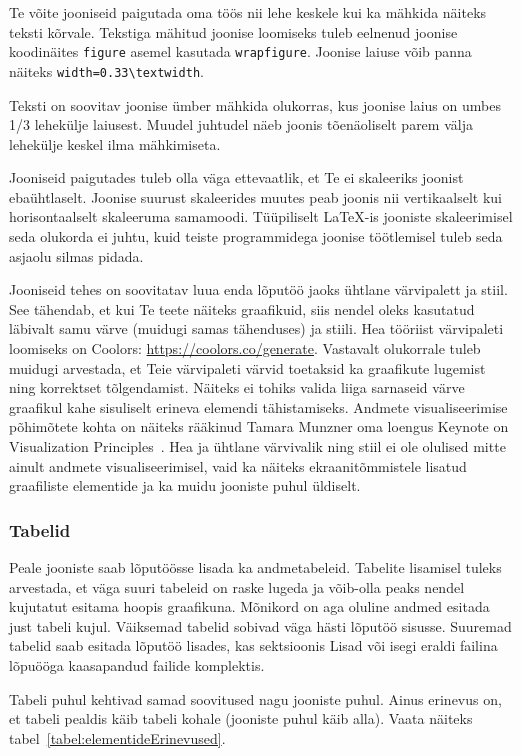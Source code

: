 Te võite jooniseid paigutada oma töös nii lehe keskele kui ka mähkida näiteks teksti kõrvale. Tekstiga mähitud joonise loomiseks tuleb eelnenud joonise koodinäites \verb|figure| asemel kasutada \verb|wrapfigure|. Joonise laiuse võib panna näiteks \verb|width=0.33\textwidth|.

Teksti on soovitav joonise ümber mähkida olukorras, kus joonise laius on umbes 1/3 lehekülje laiusest. Muudel juhtudel näeb joonis tõenäoliselt parem välja lehekülje keskel ilma mähkimiseta.

Jooniseid paigutades tuleb olla väga ettevaatlik, et Te ei skaleeriks joonist ebaühtlaselt. Joonise suurust skaleerides muutes peab joonis nii vertikaalselt kui horisontaalselt skaleeruma samamoodi. Tüüpiliselt LaTeX-is jooniste skaleerimisel seda olukorda ei juhtu, kuid teiste programmidega joonise töötlemisel tuleb seda asjaolu silmas pidada.

Jooniseid tehes on soovitatav luua enda lõputöö jaoks ühtlane värvipalett ja stiil. See tähendab, et kui Te teete näiteks graafikuid, siis nendel oleks kasutatud läbivalt samu värve (muidugi samas tähenduses) ja stiili. Hea tööriist värvipaleti loomiseks on Coolors: \url{https://coolors.co/generate}. Vastavalt olukorrale tuleb muidugi arvestada, et Teie värvipaleti värvid toetaksid ka graafikute lugemist ning korrektset tõlgendamist. Näiteks ei tohiks valida liiga sarnaseid värve graafikul kahe sisuliselt erineva elemendi tähistamiseks. Andmete visualiseerimise põhimõtete kohta on näiteks rääkinud Tamara Munzner oma loengus Keynote on Visualization Principles~\cite{tamara_munzner_keynote_2012}. Hea ja ühtlane värvivalik ning stiil ei ole olulised mitte ainult andmete visualiseerimisel, vaid ka näiteks ekraanitõmmistele lisatud graafiliste elementide ja ka muidu jooniste puhul üldiselt.

\subsubsection{Tabelid}
Peale jooniste saab lõputöösse lisada ka andmetabeleid. Tabelite lisamisel tuleks arvestada, et väga suuri tabeleid on raske lugeda ja võib-olla peaks nendel kujutatut esitama hoopis graafikuna. Mõnikord on aga oluline andmed esitada just tabeli kujul. Väiksemad tabelid sobivad väga hästi lõputöö sisusse. Suuremad tabelid saab esitada lõputöö lisades, kas sektsioonis Lisad või isegi eraldi failina lõpuööga kaasapandud failide komplektis.

Tabeli puhul kehtivad samad soovitused nagu jooniste puhul. Ainus erinevus on, et tabeli pealdis käib tabeli kohale (jooniste puhul käib alla). Vaata näiteks tabel~\ref{tabel:elementideErinevused}.

